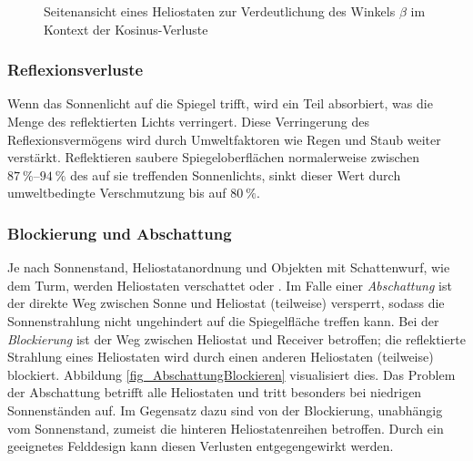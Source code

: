\begin{figure}[h!]
    \centering
    \setlength{\fboxsep}{1pt}
    \setlength{\fboxrule}{1pt}
\caption[Seitenansicht eines Heliostaten zur Verdeutlichung des Winkels $\beta$ im Kontext der Kosinus-Verluste]{Seitenansicht eines Heliostaten zur Verdeutlichung des Winkels $\beta$ im Kontext der Kosinus-Verluste \cite[S.7]{DissZanger}}
    \label{fig_KosinusVerlust}
\end{figure}


\subsubsection*{Reflexionsverluste} \label{subsubsec_Reflexionsverluste}
Wenn das Sonnenlicht auf die Spiegel trifft, wird ein Teil absorbiert, was die Menge des reflektierten Lichts verringert.
Diese Verringerung des Reflexionsvermögens wird durch Umweltfaktoren wie Regen und Staub weiter verstärkt.
Reflektieren saubere Spiegeloberflächen normalerweise zwischen $\SIrange{87}{94}{\percent}$ des auf sie treffenden Sonnenlichts, sinkt dieser Wert durch umweltbedingte Verschmutzung bis auf $\SI{80}{\percent}$. \cite[S.14]{DissBelhomme}

\subsubsection*{Blockierung und Abschattung} \label{subsubsec_blockingshading}
Je nach Sonnenstand, Heliostatanordnung und Objekten mit Schattenwurf, wie dem Turm, werden Heliostaten verschattet oder .
Im Falle einer \textit{Abschattung} ist der direkte Weg zwischen Sonne und Heliostat (teilweise) versperrt, sodass die Sonnenstrahlung nicht ungehindert auf die Spiegelfläche treffen kann.
Bei der \textit{Blockierung} ist der Weg zwischen Heliostat und Receiver betroffen; die reflektierte Strahlung eines Heliostaten wird durch einen anderen Heliostaten (teilweise) blockiert.
Abbildung \ref{fig_AbschattungBlockieren} visualisiert dies.
Das Problem der Abschattung betrifft alle Heliostaten und tritt besonders bei niedrigen Sonnenständen auf.
Im Gegensatz dazu sind von der Blockierung, unabhängig vom Sonnenstand, zumeist die hinteren Heliostatenreihen betroffen.
Durch ein geeignetes Felddesign kann diesen Verlusten entgegengewirkt werden. \cite[S.686]{Wei2010}

